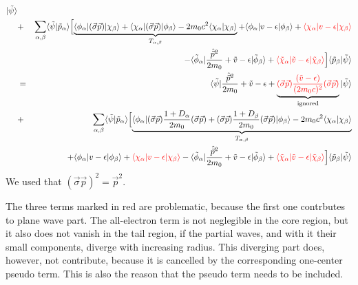 \documentclass[11pt,a4paper]{report}
\begin{document}
\begin{eqnarray}
|\tilde{\psi}\rangle
\nonumber\\
&+&\sum_{\alpha,\beta}\langle\tilde{\psi}|\tilde{p}_\alpha\rangle
\Bigl[
\underbrace{\langle\phi_\alpha|(\vec{\sigma}\vec{p})|\chi_\beta\rangle
+\langle\chi_\alpha|(\vec{\sigma}\vec{p})|\phi_\beta\rangle
-2m_0c^2\langle\chi_\alpha|\chi_\beta\rangle}_{T_{\alpha,\beta}}
+\langle\phi_\alpha|v-\epsilon|\phi_\beta\rangle
+\textcolor{red}{\langle\chi_\alpha|v-\epsilon|\chi_\beta\rangle}
\nonumber\\
%
&&\hspace{2cm}-\langle\tilde{\phi}_\alpha|
\frac{\hat{\vec{p}}^2}{2m_0}
+\tilde{v}-\epsilon|\tilde{\phi}_\beta\rangle
+
\textcolor{red}{
\langle\tilde{\chi}_\alpha|\tilde{v}-\epsilon|\tilde{\chi}_\beta\rangle}
\Bigr]\langle
\tilde{p}_\beta|\tilde{\psi}\rangle
%
\nonumber\\
&=&\langle\tilde\psi|
\frac{\hat{\vec{p}}^2}{2m_0}+\tilde{v}-\epsilon
+
\underbrace{
\textcolor{red}{(\vec{\sigma}\vec{p})\frac{(\tilde{v}-\epsilon)}{(2m_0c)^2}(\vec{\sigma}\vec{p})}}_{\textrm{ignored}}
|\tilde{\psi}\rangle
\nonumber\\
&+&\sum_{\alpha,\beta}\langle\tilde{\psi}|\tilde{p}_\alpha\rangle
\Bigl[
\underbrace{\langle\phi_\alpha|
(\vec{\sigma}\vec{p})\frac{1+D_\alpha}{2m_0}(\vec{\sigma}\vec{p})
+(\vec{\sigma}\vec{p})\frac{1+D_\beta}{2m_0}(\vec{\sigma}\vec{p})
|\phi_\beta\rangle
-2m_0c^2\langle\chi_\alpha|\chi_\beta\rangle}_{T_{\alpha,\beta}}
\nonumber\\
&&+\langle\phi_\alpha|v-\epsilon|\phi_\beta\rangle
+\textcolor{red}{\langle\chi_\alpha|v-\epsilon|\chi_\beta\rangle}
-\langle\tilde{\phi}_\alpha|
\frac{\hat{\vec{p}}^2}{2m_0}
+\tilde{v}-\epsilon|\tilde{\phi}_\beta\rangle
+
\textcolor{red}{
\langle\tilde{\chi}_\alpha|\tilde{v}-\epsilon|\tilde{\chi}_\beta\rangle}
\Bigr]\langle
\tilde{p}_\beta|\tilde{\psi}\rangle
\end{eqnarray}
We used that $(\vec{\sigma}\vec{p})^2=\vec{p}^2$.

The three terms marked in red are problematic, because
the first one contrbutes to plane wave part. The all-electron term is
not neglegible in the core region, but it also does not vanish in the
tail region, if the partial waves, and with it their small components,
diverge with increasing radius. This diverging part does, however, not
contribute, because it is cancelled by the corresponding one-center
pseudo term. This is also the reason that the pseudo term needs to be
included.
\end{document}
